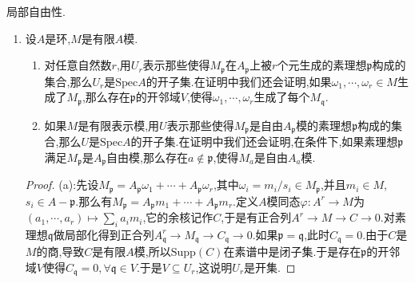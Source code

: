 局部自由性.
\begin{enumerate}
	\item 设$A$是环,$M$是有限$A$模.
	\begin{enumerate}
		\item 对任意自然数$r$,用$U_r$表示那些使得$M_{\mathfrak{p}}$在$A_{\mathfrak{p}}$上被$r$个元生成的素理想$\mathfrak{p}$构成的集合,那么$U_r$是$\mathrm{Spec}A$的开子集.在证明中我们还会证明,如果$\omega_1,\cdots,\omega_r\in M$生成了$M_{\mathfrak{p}}$,那么存在$\mathfrak{p}$的开邻域$V$,使得$\omega_1,\cdots,\omega_r$生成了每个$M_{\mathfrak{q}}$.
		\item 如果$M$是有限表示模,用$U$表示那些使得$M_{\mathfrak{p}}$是自由$A_{\mathfrak{p}}$模的素理想$\mathfrak{p}$构成的集合,那么$U$是$\mathrm{Spec}A$的开子集.在证明中我们还会证明,在条件下,如果素理想$\mathfrak{p}$满足$M_{\mathfrak{p}}$是$A_{\mathfrak{p}}$自由模,那么存在$a\not\in \mathfrak{p}$,使得$M_a$是自由$A_a$模.
	\end{enumerate}
	\begin{proof}
		
		(a):先设$M_{\mathfrak{p}}=A_{\mathfrak{p}}\omega_1+\cdots+A_{\mathfrak{p}}\omega_r$,其中$\omega_i=m_i/s_i\in M_{\mathfrak{p}}$,并且$m_i\in M$,$s_i\in A-\mathfrak{p}$.那么有$M_{\mathfrak{p}}=A_{\mathfrak{p}}m_1+\cdots+A_{\mathfrak{p}}m_r$.定义$A$模同态$\varphi:A^r\to M$为$(a_1,\cdots,a_r)\mapsto\sum_ia_im_i$,它的余核记作$C$,于是有正合列$A^r\to M\to C\to0$.对素理想$\mathfrak{q}$做局部化得到正合列$A_{\mathfrak{q}}^r\to M_{\mathfrak{q}}\to C_{\mathfrak{q}}\to0$.如果$\mathfrak{p}=\mathfrak{q}$,此时$C_{\mathfrak{q}}=0$.由于$C$是$M$的商,导致$C$是有限$A$模,所以$\mathrm{Supp}(C)$在素谱中是闭子集.于是存在$\mathfrak{p}$的开邻域$V$使得$C_{\mathfrak{q}}=0,\forall\mathfrak{q}\in V$.于是$V\subseteq U_r$,这说明$U_r$是开集.
		
		\qquad
		

\end{proof}
\end{enumerate}
